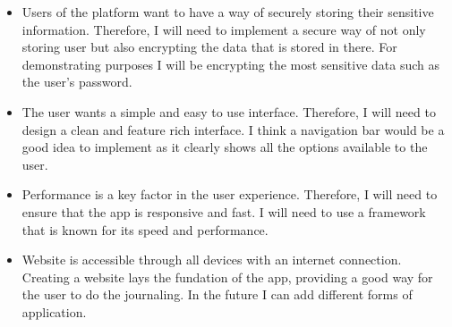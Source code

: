 \setcounter{question}{0}
    \begin{itemize}

            \item Users of the platform want to have a way of securely storing their sensitive information. Therefore, I will need to implement a secure way of not only storing user but also encrypting the data that is stored in there. For demonstrating purposes I will be encrypting the most sensitive data such as the user's password.
            

            \item The user wants a simple and easy to use interface. Therefore, I will need to design a clean and feature rich interface. I think a navigation bar would be a good idea to implement as it clearly shows all the options available to the user.

            \item Performance is a key factor in the user experience. Therefore, I will need to ensure that the app is responsive and fast. I will need to use a framework that is known for its speed and performance.

            \item Website is accessible through all devices with an internet connection. Creating a website lays the fundation of the app, providing a good way for the user to do the journaling. In the future I can add different forms of application.


\end{itemize}
